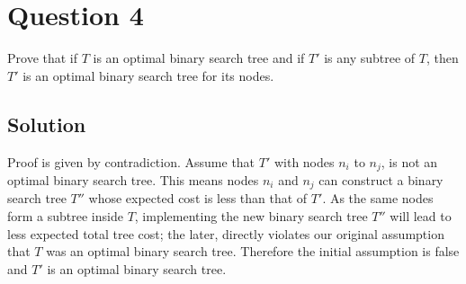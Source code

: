 
\section*{Question 4}

Prove that if $T$ is an optimal binary search tree and if $T'$ is any subtree of $T$, then $T'$ is an optimal binary search tree for its nodes.

\subsection*{Solution}

Proof is given by contradiction. Assume that $T'$ with nodes $n_i$ to $n_j$, is not an optimal binary search tree. This means nodes $n_i$ and $n_j$ can construct a binary search tree $T''$ whose expected cost is less than that of $T'$. As the same nodes form a subtree inside $T$, implementing the new binary search tree $T''$ will lead to less expected total tree cost; the later, directly violates our original assumption that $T$ was an optimal binary search tree. Therefore the initial assumption is false and $T'$ is an optimal binary search tree.
